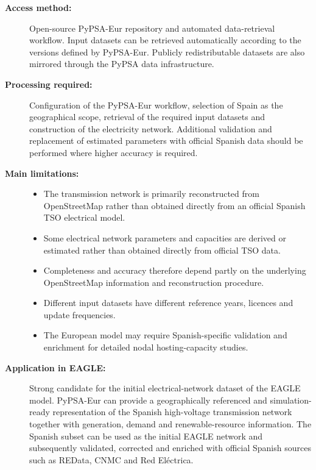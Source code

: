 \begin{description}
    \item[\textbf{Access method:}]
    Open-source PyPSA-Eur repository and automated data-retrieval workflow.
    Input datasets can be retrieved automatically according to the versions
    defined by PyPSA-Eur. Publicly redistributable datasets are also mirrored
    through the PyPSA data infrastructure.

    \item[\textbf{Processing required:}]
    Configuration of the PyPSA-Eur workflow, selection of Spain as the
    geographical scope, retrieval of the required input datasets and
    construction of the electricity network. Additional validation and
    replacement of estimated parameters with official Spanish data should
    be performed where higher accuracy is required.

    \item[\textbf{Main limitations:}] \hfill
    \begin{itemize}
        \item The transmission network is primarily reconstructed from
        OpenStreetMap rather than obtained directly from an official
        Spanish TSO electrical model.
        \item Some electrical network parameters and capacities are derived
        or estimated rather than obtained directly from official TSO data.
        \item Completeness and accuracy therefore depend partly on the
        underlying OpenStreetMap information and reconstruction procedure.
        \item Different input datasets have different reference years,
        licences and update frequencies.
        \item The European model may require Spanish-specific validation
        and enrichment for detailed nodal hosting-capacity studies.
    \end{itemize}

    \item[\textbf{Application in EAGLE:}]
    Strong candidate for the initial electrical-network dataset of the
    EAGLE model. PyPSA-Eur can provide a geographically referenced and
    simulation-ready representation of the Spanish high-voltage transmission
    network together with generation, demand and renewable-resource
    information. The Spanish subset can be used as the initial EAGLE network
    and subsequently validated, corrected and enriched with official Spanish
    sources such as REData, CNMC and Red Eléctrica.

\end{description}

